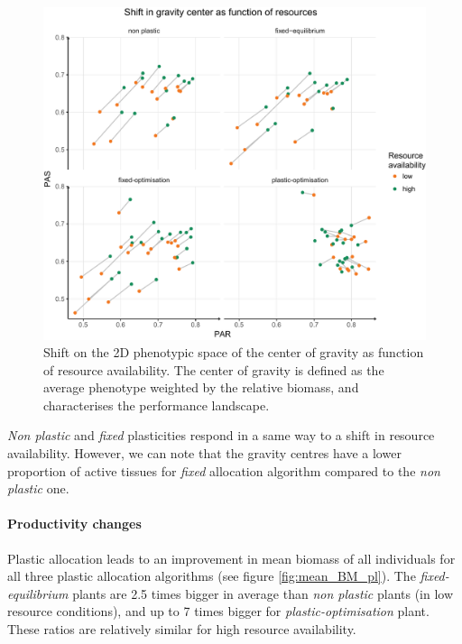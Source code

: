 \begin{figure}
\includegraphics[width = \textwidth]{./2_PP/Figures/Landscape/ld_gravity_resourceall.pdf}
\caption{Shift on the 2D phenotypic space of the center of gravity as function of resource availability. The center of gravity is defined as the average phenotype weighted by the relative biomass, and characterises the performance landscape.}\label{fig:gravity_shift_resource}
\end{figure}

\textit{Non plastic} and \textit{fixed} plasticities respond in a same way to a shift in resource availability. However, we can note that the gravity centres have a lower proportion of active tissues for \textit{fixed} allocation algorithm compared to the \textit{non plastic} one.


\paragraph{Productivity changes}

Plastic allocation leads to an improvement in mean biomass of all individuals for all three plastic allocation algorithms (see figure \ref{fig:mean_BM_pl}). The \textit{fixed-equilibrium} plants are 2.5 times bigger in average than \textit{non plastic} plants (in low resource conditions), and up to 7 times bigger for \textit{plastic-optimisation} plant. These ratios are relatively similar for high resource availability. 

